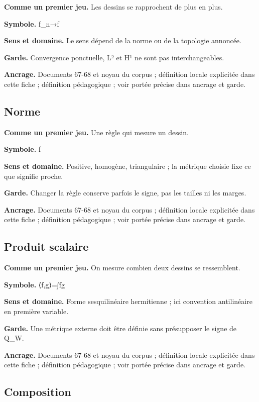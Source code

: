 \documentclass[
  9pt,
  a4paper,
]{article}
\begin{document}
\textbf{Comme un premier jeu.} Les dessins se rapprochent de plus en
plus.

\textbf{Symbole.} f\_n→f

\textbf{Sens et domaine.} Le sens dépend de la norme ou de la topologie
annoncée.

\textbf{Garde.} Convergence ponctuelle, L² et H¹ ne sont pas
interchangeables.

\textbf{Ancrage.} Documents 67-68 et noyau du corpus ; définition locale
explicitée dans cette fiche ; définition pédagogique ; voir portée
précise dans ancrage et garde.

\hypertarget{norme}{%
\subsection{Norme}\label{norme}}

\textbf{Comme un premier jeu.} Une règle qui mesure un dessin.

\textbf{Symbole.} \textbar\textbar f\textbar\textbar{}

\textbf{Sens et domaine.} Positive, homogène, triangulaire ; la métrique
choisie fixe ce que signifie proche.

\textbf{Garde.} Changer la règle conserve parfois le signe, pas les
tailles ni les marges.

\textbf{Ancrage.} Documents 67-68 et noyau du corpus ; définition locale
explicitée dans cette fiche ; définition pédagogique ; voir portée
précise dans ancrage et garde.

\hypertarget{produit-scalaire}{%
\subsection{Produit scalaire}\label{produit-scalaire}}

\textbf{Comme un premier jeu.} On mesure combien deux dessins se
ressemblent.

\textbf{Symbole.} ⟨f,g⟩=∫f̄g

\textbf{Sens et domaine.} Forme sesquilinéaire hermitienne ; ici
convention antilinéaire en première variable.

\textbf{Garde.} Une métrique externe doit être définie sans présupposer
le signe de Q\_W.

\textbf{Ancrage.} Documents 67-68 et noyau du corpus ; définition locale
explicitée dans cette fiche ; définition pédagogique ; voir portée
précise dans ancrage et garde.

\hypertarget{composition}{%
\subsection{Composition}\label{composition}}
\end{document}
